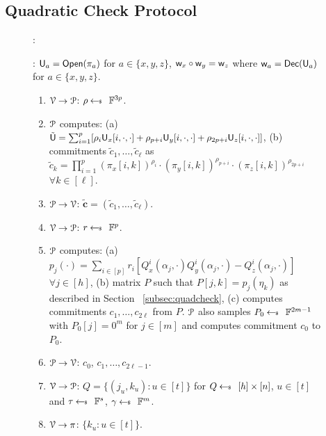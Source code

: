 \subsection{Quadratic Check Protocol}

\begin{figure}[h!]
	{\footnotesize
		\begin{framed}
			:
			
			: $\ewit_a=\open(\pi_a)$ for $a\in \{x,y,z\}$, $\wit_x \circ \wit_y = \wit_z$ where  $\wit_a=\dec(\ewit_a)$ for $a\in \{x,y,z\}$.
			
			\begin{enumerate}[{\rm 1.}]
				\item $\verifier\rightarrow\prover$: $\rho\sample \FF^{3p}$.
				\item $\prover$ computes: (a) $\tilde{\ewit}=\sum_{i=1}^p[\rho_i\ewit_x[i,\cdot,\cdot] + \rho_{p+i}\ewit_y[i,\cdot,\cdot]+\rho_{2p+i}\ewit_z[i,\cdot,\cdot]]$, (b)
				commitments $\tilde{c}_1,\ldots,\tilde{c}_\ell$ as $\tilde{c}_k = \prod_{i=1}^{p} (\pi_x[i,k])^{\rho_i}\cdot (\pi_y[i,k])^{\rho_{p+i}}\cdot(\pi_z[i,k])^{\rho_{2p+i}}$ $\forall k\in[\ell]$.
				\item $\prover\rightarrow\verifier$: $\tilde{\bm{c}}=(\tilde{c}_1,\ldots,\tilde{c}_\ell)$.
				\item $\verifier\rightarrow\prover$: $r\sample \FF^p$.
				\item $\prover$ computes: (a) $p_j(\cdot) = \sum_{i\in[p]} r_i[Q^i_x(\alpha_j,\cdot)Q^i_y(\alpha_j,\cdot) - Q^i_z(\alpha_j,\cdot)]$ $\forall j\in [h]$, (b) matrix $P$ such that $P[j,k] = p_j(\eta_k)$ as described in Section ~\ref{subsec:quadcheck}, (c) computes commitments $c_1,\ldots,c_{2\ell}$ from $P$. $\prover$ also samples $P_0\sample \FF^{2m-1}$ with $P_0[j]=0^m$ for $j\in[m]$ and computes commitment $c_0$ to $P_0$.
				\item $\prover\rightarrow\verifier$: $c_0$, $c_1,\ldots,c_{2\ell-1}$.
				\item $\verifier\rightarrow\prover$: $Q=\{(j_u,k_u):u\in [t]\}$ for $Q\sample [h]\times [n]$, $u\in [t]$ and $\tau \sample \FF^s$, $\gamma \sample \FF^m$.
				\item $\verifier\rightarrow\pi$: $\{k_u:u\in [t]\}$.

\end{enumerate}
\end{framed}}
\end{figure}
